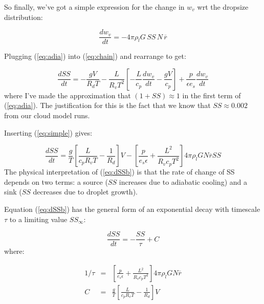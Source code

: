 \documentclass[12pt]{article}
\begin{document}
So finally, we've got a simple expression for the change in $w_v$ wrt the
dropsize distribution:

\begin{equation}
  \label{eq:simple}
  \frac{d w_v}{dt} = - 4\pi \rho_l G\,SS\,N\,\overline{r}
\end{equation}

Plugging  (\ref{eq:adia}) into (\ref{eq:chain}) and rearrange to get:

\begin{equation}
  \label{eq:dSS}
  \frac{d SS}{dt} = - \frac{g V}{R_d T} - \frac{L}{R_v T^2}  \left [- \frac{L}{c_p} \frac{dw_v}{dt}
- \frac{g V}{c_p} \right ] + \frac{p }{\epsilon e_s} \frac{dw_v}{dt}
\end{equation}
where I've made the approximation that $(1 + SS) \approx 1$ in the first term of (\ref{eq:adia}).
The justification for this is the fact that we know that $SS \approx 0.002$ from
our cloud model runs.

Inserting (\ref{eq:simple}) gives:

\begin{equation}
  \label{eq:dSSb}
  \frac{d SS}{dt} =  \frac{g }{T}  \left [ \frac{L}{c_p R_v T} 
- \frac{1}{R_d} \right ] V  - \left [ \frac{p}{e_s \epsilon} + \frac{L^2}{R_v c_p T^2} \right ]
4 \pi \rho_l G N \overline{r} SS
\end{equation}
The physical interpretation of  (\ref{eq:dSSb}) is that the rate of change of SS depends
on two terms: a source ($SS$ increases due to adiabatic cooling) and a sink ($SS$ decreases
due to droplet growth).

Equation (\ref{eq:dSSb}) has the general form of an exponential decay with timescale $\tau$
to a limiting value $SS_\infty$:

\begin{equation}
  \label{eq:general}
  \frac{d SS}{dt} = - \frac{SS}{\tau} + C
\end{equation}
where:

\begin{subequations}
\label{eq:coeffs}
  \begin{eqnarray}
    \label{eq:various2}
    1/\tau &=& \left [ \frac{p}{e_s \epsilon} + \frac{L^2}{R_v c_p T^2} \right ]
                    4 \pi \rho_l G N \overline{r} \\
    C &=& \frac{g }{T}  \left [ \frac{L}{c_p R_v T} 
            - \frac{1}{R_d} \right ] V
  \end{eqnarray}
\end{subequations}
\end{document}

